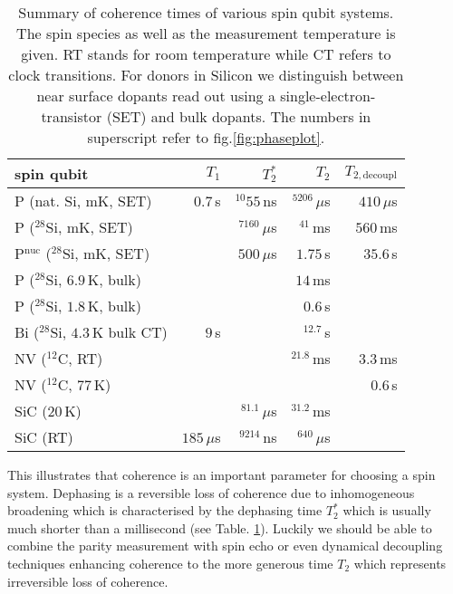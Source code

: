 \bgroup
\def\arraystretch{1.3}%
\begin{table}[H]
	\begin{tabular}{lrrrr}
		\hline
		spin qubit & $T_1$ & $T_2^{*}$ & $T_2$ & $T_{2,\textrm{decoupl}}$ \\ \hline
		P (nat. Si, mK, SET) \cite{Pla2012}& $0.7\, $s & $^{10}55\, $ns  & $^5206\, \mu$s & $410\, \mu$s  \\
		P ($^{28}$Si, mK, SET) \cite{Muhonen2014}&  & $^7160\, \mu$s  & $^41\, $ms & $560\, $ms \\
		P$^{\text{nuc}}$ ($^{28}$Si, mK, SET) \cite{Muhonen2014}& & $500\, \mu$s & $1.75\, $s & $35.6\, $s \\
		P ($^{28}$Si, $6.9\, $K, bulk) \cite{Morley2010}& &  & $14\, $ms &  \\
		P ($^{28}$Si, $1.8\, $K, bulk) \cite{Tyryshkin2011}& &  & $0.6\, $s &  \\
		Bi ($^{28}$Si, $4.3\, $K bulk CT) \cite{Wolfowicz2013} & $9\, $s &  & $^12.7\, $s &\\
		NV ($^{12}$C, RT) \cite{Balasubramanian2009,Bar-Gill2013} & & & $^21.8\, $ms & $3.3\, $ms \\
		NV ($^{12}$C, $77\, $K) \cite{Bar-Gill2013} & & &  & $0.6\, $s \\
		SiC ($20\, $K) \cite{Christle2014} & & $^81.1\, \mu$s & $^31.2\, $ms &  \\
		SiC (RT) \cite{Koehl2011} & $185\, \mu$s & $^9214\, $ns & $^640\, \mu$s &   \\\hline
	\end{tabular} 
	\caption{Summary of coherence times of various spin qubit systems. The spin species as well as the measurement temperature is given. RT stands for room temperature while CT refers to clock transitions. For donors in Silicon we distinguish between near surface dopants read out using a single-electron-transistor (SET) and bulk dopants. The numbers in superscript refer to fig.\@ \ref{fig:phaseplot}.}
	\label{TAB:qubits}
\end{table}
\egroup


This illustrates that coherence is an important parameter for choosing a spin system. Dephasing is a reversible loss of coherence due to inhomogeneous broadening which is characterised by the dephasing time $T_2^*$ which is usually much shorter than a millisecond (see Table. \ref{TAB:qubits}). Luckily we should be able to combine the parity measurement with spin echo or even dynamical decoupling techniques enhancing coherence to the more generous time $T_2$ which represents irreversible loss of coherence.

